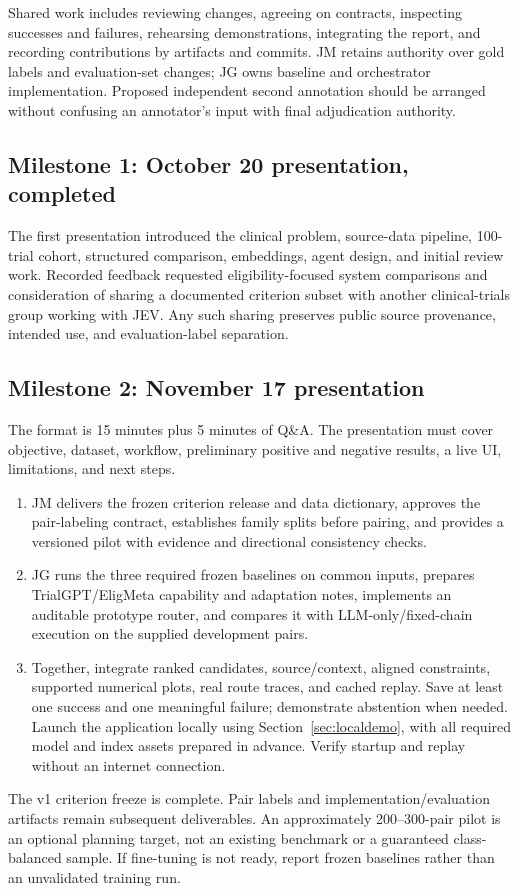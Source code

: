 \documentclass[10pt,letterpaper]{article}
\begin{document}
Shared work includes reviewing changes, agreeing on contracts, inspecting
successes and failures, rehearsing demonstrations, integrating the report,
and recording contributions by artifacts and commits. JM retains authority
over gold labels and evaluation-set changes; JG owns baseline and orchestrator
implementation. Proposed independent second annotation should be arranged
without confusing an annotator's input with final adjudication authority.

\subsection{Milestone 1: October 20 presentation, completed}
The first presentation introduced the clinical problem, source-data pipeline,
100-trial cohort, structured comparison, embeddings, agent design, and initial review work.
Recorded feedback requested eligibility-focused system comparisons and
consideration of sharing a documented criterion subset with another
clinical-trials group working with JEV. Any such sharing preserves public
source provenance, intended use, and evaluation-label separation.

\subsection{Milestone 2: November 17 presentation}
The format is 15 minutes plus 5 minutes of Q\&A. The presentation must cover
objective, dataset, workflow, preliminary positive and negative results, a
live UI, limitations, and next steps.
\begin{enumerate}
\item JM delivers the frozen criterion release and data dictionary, approves
the pair-labeling contract, establishes family splits before pairing, and
provides a versioned pilot with evidence and directional consistency checks.
\item JG runs the three required frozen baselines on common inputs, prepares
TrialGPT/EligMeta capability and adaptation notes, implements an auditable
prototype router, and compares it with LLM-only/fixed-chain execution on
the supplied development pairs.
\item Together, integrate ranked candidates, source/context, aligned
constraints, supported numerical plots, real route traces, and cached replay.
Save at least one success and one meaningful failure; demonstrate abstention
when needed. Launch the application locally using
Section~\ref{sec:localdemo}, with all required model and index assets prepared
in advance. Verify startup and replay without an internet connection.
\end{enumerate}
The v1 criterion freeze is complete. Pair labels and implementation/evaluation
artifacts remain subsequent deliverables. An approximately 200--300-pair pilot
is an optional planning target, not an existing benchmark or a guaranteed
class-balanced sample. If fine-tuning is not ready, report frozen baselines
rather than an unvalidated training run.
\end{document}
